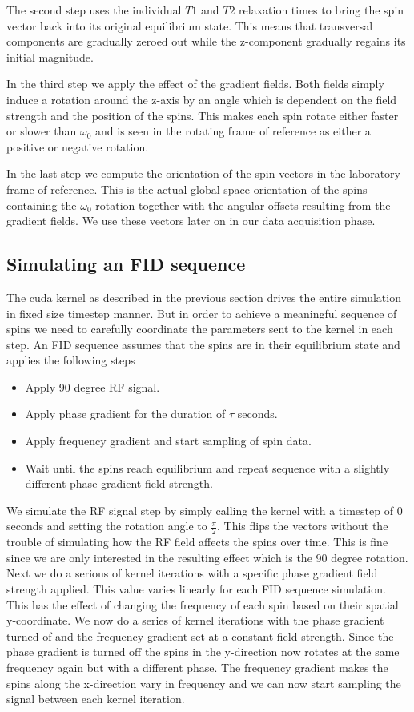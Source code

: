 The second step uses the individual $T1$ and $T2$ relaxation times to
bring the spin vector back into its original equilibrium state. This
means that transversal components are gradually zeroed out while the
z-component gradually regains its initial magnitude.

In the third step we apply the effect of the gradient fields. Both
fields simply induce a rotation around the z-axis by an angle which is
dependent on the field strength and the position of the spins. This
makes each spin rotate either faster or slower than $\omega_0$ and is
seen in the rotating frame of reference as either a positive or
negative rotation. 

In the last step we compute the orientation of the spin vectors in the
laboratory frame of reference. This is the actual global space
orientation of the spins containing the $\omega_0$ rotation together
with the angular offsets resulting from the gradient fields. We use
these vectors later on in our data acquisition phase.

\subsection{Simulating an FID sequence}

The cuda kernel as described in the previous section drives the entire
simulation in fixed size timestep manner. But in order to achieve a
meaningful sequence of spins we need to carefully coordinate the
parameters sent to the kernel in each step. An FID sequence assumes
that the spins are in their equilibrium state and applies the following steps
\begin{itemize}
\item Apply 90 degree RF signal.
\item Apply phase gradient for the duration of $\tau$ seconds.
\item Apply frequency gradient and start sampling of spin data.
\item Wait until the spins reach equilibrium and repeat sequence with
  a slightly different phase gradient field strength.
\end{itemize}
We simulate the RF signal step by simply calling the kernel with a
timestep of $0$ seconds and setting the rotation angle to
$\frac{\pi}{2}$. This flips the vectors without the trouble of
simulating how the RF field affects the spins over time. This is fine
since we are only interested in the resulting effect which is the 90
degree rotation. Next we do a serious of kernel iterations with a
specific phase gradient field strength applied. This value varies
linearly for each FID sequence simulation. This has the effect of
changing the frequency of each spin based on their spatial
y-coordinate. We now do a series of kernel iterations with the phase
gradient turned of and the frequency gradient set at a constant field
strength. Since the phase gradient is turned off the spins in the
y-direction now rotates at the same frequency again but with a
different phase. The frequency gradient makes the spins along the
x-direction vary in frequency and we can now start sampling the signal
between each kernel iteration.

